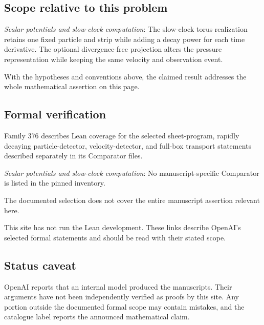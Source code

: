\documentclass[11pt]{article}
\begin{document}
\subsection{Scope relative to this problem}
\textit{Scalar potentials and slow-clock computation}: The slow-clock torus realization retains one fixed particle and strip while adding a decay power for each time derivative. The optional divergence-free projection alters the pressure representation while keeping the same velocity and observation event.

With the hypotheses and conventions above, the claimed result addresses the whole mathematical assertion on this page.

\subsection{Formal verification}
Family 376 describes Lean coverage for the selected sheet-program, rapidly decaying particle-detector, velocity-detector, and full-box transport statements described separately in its Comparator files.

\textit{Scalar potentials and slow-clock computation}: No manuscript-specific Comparator is listed in the pinned inventory.

The documented selection does not cover the entire manuscript assertion relevant here.

This site has not run the Lean development. These links describe OpenAI’s selected formal statements and should be read with their stated scope.

\subsection{Status caveat}
OpenAI reports that an internal model produced the manuscripts. Their arguments have not been independently verified as proofs by this site. Any portion outside the documented formal scope may contain mistakes, and the catalogue label reports the announced mathematical claim.
\end{document}
